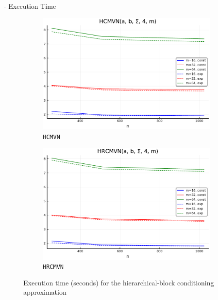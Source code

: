 \begin{frame}[allowframebreaks]{\subsecname - Execution Time}
	\begin{figure}
		\centering
				\begin{subfigure}[b]{0.45\textwidth}
						\centering
						\includegraphics[width=\linewidth]{figs/table3_m2.pdf}
						\caption{\texttt{HCMVN}}
				\end{subfigure}\hfill
				\begin{subfigure}[b]{0.45\textwidth}
						\centering
						\includegraphics[width=\linewidth]{figs/table3_m3.pdf}
						\caption{\texttt{HRCMVN}}
				\end{subfigure}
		\caption{Execution time (seconds) for the hierarchical-block conditioning approximation}\label{fig:table3_hctime}
	\end{figure}	


\end{frame}